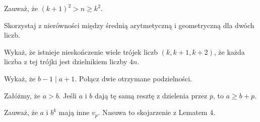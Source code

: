
\begin{hints_list}
	\item Zauważ, że $(k + 1)^2 > n \geqslant k^2$.
	\item Skorzystaj z nierówności między średnią arytmetyczną i geometryczną dla dwóch liczb.
	\item Wykaż, że istnieje nieskończenie wiele trójek liczb $(k, k + 1, k + 2)$, że każda liczba z tej trójki jest dzielnikiem liczby $4n$.
	\item Wykaż, że $b - 1 \mid a + 1$. Połącz dwie otrzymane podzielności.
	\item Załóżmy, że $a > b$. Jeśli $a$ i $b$ dają tę samą resztę z dzielenia przez $p$, to $a \geqslant b + p$.
	\item Zauważ, że $a$ i $b^k$ mają inne $v_p$. Nasuwa to skojarzenie z Lematem 4.
\end{hints_list}